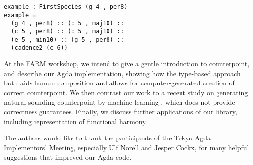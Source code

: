\documentclass[sigplan,review]{acmart}\settopmatter{printfolios=true,printccs=false,printacmref=false}
\begin{document}
\begin{lstlisting}
example : FirstSpecies (g 4 , per8)
example = 
  (g 4 , per8) :: (c 5 , maj10) ::
  (c 5 , per8) :: (c 5 , maj10) ::
  (e 5 , min10) :: (g 5 , per8) ::
  (cadence2 (c 6))
\end{lstlisting}

At the FARM workshop, we intend to give a gentle introduction to
counterpoint, and describe our Agda implementation, showing how the
type-based approach both aids human composition and allows for 
computer-generated creation of correct counterpoint.
We then contrast our work to a recent study on generating
natural-sounding counterpoint by machine learning
\citep{CounterpointByConvolution}, which does not provide correctness
guarantees.
Finally, we discuss further applications of our library, including
representation of functional harmony.


\begin{acks}                            %
 The authors would like to thank the participants of the Tokyo Agda 
 Implementors' Meeting, especially Ulf Norell and Jesper Cockx,
 for many helpful suggestions that improved our Agda code.
\end{acks}



\end{document}
